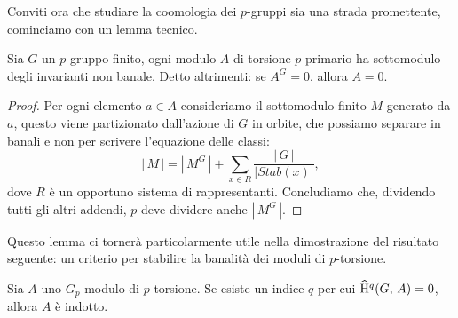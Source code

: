 Conviti ora che studiare la coomologia dei $ p $-gruppi sia una strada promettente, 
cominciamo con un lemma tecnico.

\begin{lemma}\label{ban1}
	Sia $ G $ un $ p $-gruppo finito, ogni modulo $ A $ di torsione $ p $-primario ha sottomodulo degli invarianti non banale. Detto altrimenti: se $ A^G = 0 $, allora $ A = 0 $.
\end{lemma}
\begin{proof}
	Per ogni elemento $ a \in A $ consideriamo il sottomodulo finito $ M $ generato da $ a $, questo viene partizionato dall'azione di $ G $ in orbite, che possiamo separare in banali e non per scrivere l'equazione delle classi:
	\[ |\,M\,| = |\, M^G\,| +\sum_{x \in R} \frac{|\,G\,|}{|Stab(x)|},  \]
	dove $ R $ è un opportuno sistema di rappresentanti. Concludiamo che, dividendo tutti gli altri addendi, $ p $ deve dividere anche $ |\, M^G \, | $.
\end{proof}

Questo lemma ci tornerà particolarmente utile nella dimostrazione del risultato seguente: un criterio per stabilire la banalità dei moduli di $ p $-torsione.

\begin{proposition} \label{ban2}
	Sia $ A $ uno $ G_p $-modulo di $ p $-torsione.
	Se esiste un indice $ q $ per cui $ \operatorname{\widehat{H}^\mathnormal{q}}(G, \, A) = 0 $, allora $ A $ è indotto.
\end{proposition}

